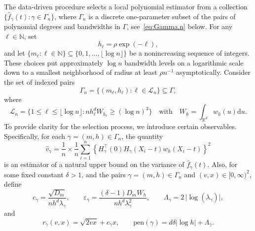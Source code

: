 \documentclass[bj,authoryear]{imsart}
\numberwithin{equation}{section}
\theoremstyle{plain}
\theoremstyle{remark}
\newcommand{\N}{\mathbb{N}}
\newcommand{\R}{\mathbb{R}}
\newcommand{\1}{\mathds{1}}
\newcommand{\rd}{\mathrm{d}}
\begin{document}
    The data-driven procedure selects a local polynomial estimator from a collection $\{\hat{f}_{\gamma}(t): \gamma\in \Gamma_{\!n}\}$, where $\Gamma_{\!n}$ is a discrete one-parameter subset of the pairs of polynomial degrees and bandwidths in $\Gamma$, see~\eqref{eq:Gamma.n} below.
    For any $\ell\in \N$, set
    \begin{equation}\label{eq:h.in.Gamma.n}
        h_{\ell} = \rho\exp(-\ell),
    \end{equation}
    and let $\{m_{\ell} : \ell\in \N\}\subseteq \{0,1,\ldots,\lfloor\log n\rfloor\}$ be a nonincreasing sequence of integers. These choices put approximately $\log n$ bandwidth levels on a logarithmic scale down to a smallest neighborhood of radius at least $\rho n^{-1}$ asymptotically. Consider the set of indexed pairs
    \begin{equation}\label{eq:Gamma.n}
        \Gamma_{\!n} = \{(m_{\ell}, h_{\ell}) : \ell\in \mathcal{L}_n\}\subseteq \Gamma,
    \end{equation}
    where
    \begin{equation}\label{eq:L.n.W.h}
        \mathcal{L}_n = \big\{1 \leq \ell \leq \lfloor\log n\rfloor : n h^d_{\ell} W_{h_{\ell}}\geq (\log n)^3\big\}
        \quad \text{with} \quad
        W_h =\int_{\R^d} w_h(u) \rd u.
    \end{equation}
    To provide clarity for the selection process, we introduce certain observables.
    Specifically, for each $\gamma=(m,h)\in \Gamma_{\!n}$, the quantity
    \begin{equation}\label{eq:hat.v.gamma}
        \hat{v}_{\gamma} = \frac{1}{n} \times \frac{1}{n} \sum_{i=1}^n \left\{H_{\gamma}^{\top}(0) H_{\gamma}(X_i-t) w_h(X_i-t)\right\}^2
    \end{equation}
    is an estimator of a natural upper bound on the variance of $\hat{f}_{\gamma}(t)$.
    Also, for some fixed constant $\delta > 1$, and the pairs $\gamma=(m,h)\in \Gamma_{\!n}$ and $(v,x)\in [0,\infty)^2$, define
    \begin{equation}\label{eq:c.gamma}
        c_{\gamma} = \frac{\sqrt{D_m}}{n h^d \lambda_{\gamma}},
        \qquad
        \varepsilon_{\gamma} = \frac{(\delta-1) D_m W_h}{n h^d \lambda_{\gamma}^2},
        \qquad
        \Lambda_{\gamma} = 2 \, \lvert\log(\lambda_{\gamma})\rvert,
    \end{equation}
    and
    \begin{equation}\label{eq:r.gamma.and.pen.gamma}
        r_{\gamma}(v,x) = \sqrt{2vx} + c_{\gamma} x,
        \qquad
        \mathrm{pen}(\gamma) = d\delta\lvert\log h\rvert + \Lambda_{\gamma}.
    \end{equation}
\end{document}
